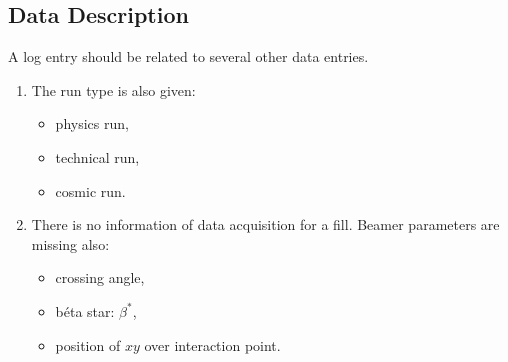 \subsection{Data Description}
A log entry should be related to several other data entries.
\begin{enumerate}
  \item The run type is also given:
  \begin{itemize}
    \item physics run,
    \item technical run,
    \item cosmic run.
  \end{itemize}
  \item There is no information of data acquisition for a fill. Beamer parameters are missing also:
  \begin{itemize}
    \item crossing angle,
    \item b\'eta star: $\beta^*$,
    \item position of $xy$ over interaction point.
  \end{itemize}
\end{enumerate}



